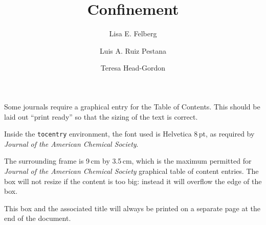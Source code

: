 \documentclass[journal=acsnano,manuscript=article]{achemso}
\author{Lisa E. Felberg}
\author{Luis A. Ruiz Pestana}
\author{Teresa Head-Gordon}
\title[confinement]
  {Confinement}
\begin{document}
\begin{tocentry}

Some journals require a graphical entry for the Table of Contents.
This should be laid out ``print ready'' so that the sizing of the
text is correct.

Inside the \texttt{tocentry} environment, the font used is Helvetica
8\,pt, as required by \emph{Journal of the American Chemical
Society}.

The surrounding frame is 9\,cm by 3.5\,cm, which is the maximum
permitted for  \emph{Journal of the American Chemical Society}
graphical table of content entries. The box will not resize if the
content is too big: instead it will overflow the edge of the box.

This box and the associated title will always be printed on a
separate page at the end of the document.

\end{tocentry}

\begin{abstract}
  
\end{abstract}

\end{document}
